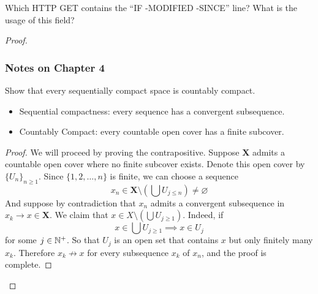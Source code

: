\documentclass[../../main.tex]{subfiles}
\begin{document}
\begin{wts}
Which HTTP GET contains the “IF -MODIFIED -SINCE” line? What is the usage of this field?
\end{wts}
\begin{proof}



\providecommand{\szz}{\mathcal{S}}
\providecommand{\ccinf}{C_c^\infty}
\subsubsection*{Notes on Chapter 4}
\begin{wts}
    Show that every sequentially compact space is countably compact. \begin{itemize}
    \item Sequential compactness: every sequence has a convergent subsequence.
    \item Countably Compact: every countable open cover has a finite subcover.
    \end{itemize}
\end{wts}
\providecommand{\xx}{\mathbf{X}}
\begin{proof}
    We will proceed by proving the contrapositive. Suppose $\xx$ admits a countable open cover where no finite subcover exists. Denote this open cover by $\{U_n\}_{n\geq 1}$. Since $\{1,2,\ldots,n\}$ is finite, we can choose a sequence 
    \[x_n\in \xx\setminus \left(\bigcup U_{j\leq n}\right)\neq\varnothing\]
    And suppose by contradiction that $x_n$ admits a convergent subsequence in $x_k\to x\in \xx$. We claim that $x\in X\setminus\left(\bigcup U_{j\geq 1}\right)$. Indeed, if\[x\in \bigcup U_{j\geq 1}\implies x\in U_j\]
    for some $j\in \mathbb{N}^+$. So that $U_j$ is an open set that contains $x$ but only finitely many $x_k$. Therefore $x_k\not\to x$ for every subsequence $x_k$ of $x_n$, and the proof is complete.
\end{proof}
\end{proof}
\end{document}
